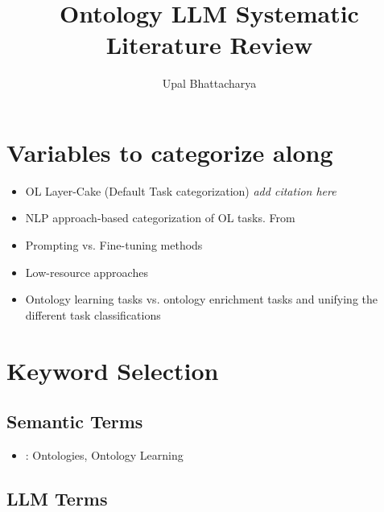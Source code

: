 \documentclass[a4paper,colorinlistoftodos]{article}
\author{Upal Bhattacharya}
\date{}
\title{Ontology LLM Systematic Literature Review}
\begin{document}
\maketitle

\begingroup
    \hypersetup{linkcolor=black}
    \tableofcontents
    \listoftodos
    \pagebreak
\endgroup

\linenumbers

\section{Variables to categorize along}
\label{sec:variables}

\begin{itemize}
\item OL Layer-Cake (Default Task categorization) \textit{add citation here}
\item NLP approach-based categorization of OL tasks.
  From \cite{du2024ShortReviewOntology}
\item Prompting vs. Fine-tuning methods
\item Low-resource approaches
\item Ontology learning tasks vs. ontology enrichment tasks and unifying the
  different task classifications
\end{itemize}

\section{Keyword Selection}
\label{sec:keyword-selection}

\subsection{Semantic Terms}
\label{subsec:semantic-terms}

\begin{itemize}
  \item \citep{babaei2023Llms4olLargeLanguage}: Ontologies, Ontology Learning
\end{itemize}

\subsection{LLM Terms}
\label{subsec:llm-terms}



\end{document}
